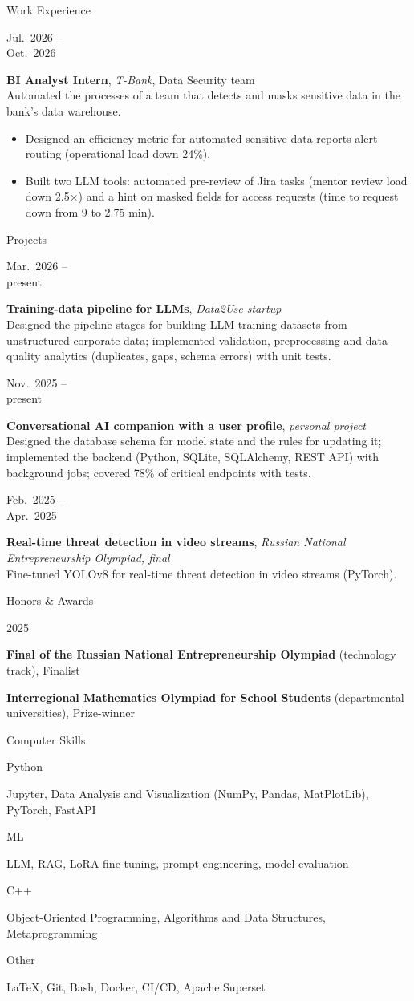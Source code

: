 \documentclass[10pt,a4paper]{article}
\newlength{\datecol}\setlength{\datecol}{2.3cm}
\newcommand{\cvsection}[1]{%
  \vspace{3pt}%
  \noindent\makebox[\datecol][r]{\color{accent}\rule[0.25ex]{\datecol}{3pt}}\hspace{6pt}%
  {\color{accent}\Large #1}\par\vspace{2pt}}
\newlength{\bodycol}
\newcommand{\cventry}[2]{%
  \setlength{\bodycol}{\dimexpr\linewidth-\datecol-6pt\relax}%
  \noindent\parbox[t]{\datecol}{\raggedleft\small\strut #1}\hspace{6pt}%
  \parbox[t]{\bodycol}{\strut #2}\par\vspace{2pt}}
\begin{document}
\cvsection{Work Experience}
\cventry{Jul.\ 2026 --\\Oct.\ 2026}{%
  \textbf{BI Analyst Intern}, \textit{T-Bank}, Data Security team\\
  Automated the processes of a team that detects and masks sensitive data in the bank's data warehouse.
  \begin{itemize}
    \item Designed an efficiency metric for automated sensitive data-reports alert routing (operational load down 24\%).
    \item Built two LLM tools: automated pre-review of Jira tasks (mentor review load down 2.5$\times$) and a hint on masked fields for access requests (time to request down from 9 to 2.75 min).
  \end{itemize}}

\cvsection{Projects}
\cventry{Mar.\ 2026 --\\present}{%
  \textbf{Training-data pipeline for LLMs}, \textit{Data2Use startup}\\
  Designed the pipeline stages for building LLM training datasets from unstructured corporate data; implemented validation, preprocessing and data-quality analytics (duplicates, gaps, schema errors) with unit tests.}
\cventry{Nov.\ 2025 --\\present}{%
  \textbf{Conversational AI companion with a user profile}, \textit{personal project}\\
  Designed the database schema for model state and the rules for updating it; implemented the backend (Python, SQLite, SQLAlchemy, REST API) with background jobs; covered 78\% of critical endpoints with tests.}
\cventry{Feb.\ 2025 --\\Apr.\ 2025}{%
  \textbf{Real-time threat detection in video streams}, \textit{Russian National Entrepreneurship Olympiad, final}\\
  Fine-tuned YOLOv8 for real-time threat detection in video streams (PyTorch).}

\cvsection{Honors \& Awards}
\cventry{2025}{\textbf{Final of the Russian National Entrepreneurship Olympiad} (technology track), Finalist}
\cventry{}{\textbf{Interregional Mathematics Olympiad for School Students} (departmental universities), Prize-winner}

\cvsection{Computer Skills}
\cventry{Python}{Jupyter, Data Analysis and Visualization (NumPy, Pandas, MatPlotLib), PyTorch, FastAPI}
\cventry{ML}{LLM, RAG, LoRA fine-tuning, prompt engineering, model evaluation}
\cventry{C++}{Object-Oriented Programming, Algorithms and Data Structures, Metaprogramming}
\cventry{Other}{LaTeX, Git, Bash, Docker, CI/CD, Apache Superset}
\end{document}
